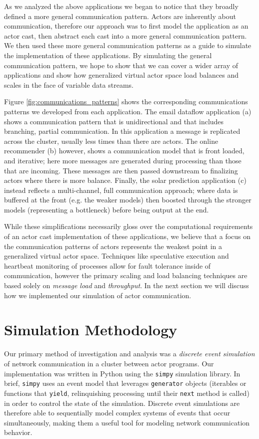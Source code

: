 \documentclass[draftclsnofoot,onecolumn,conference,11pt]{IEEEtran}
\begin{document}
As we analyzed the above applications we began to notice that they broadly defined a more general communication pattern. Actors are inherently about communication, therefore our approach was to first model the application as an actor cast, then abstract each cast into a more general communication pattern. We then used these more general communication patterns as a guide to simulate the implementation of these applications. By simulating the general communication pattern, we hope to show that we can cover a wider array of applications and show how generalized virtual actor space load balances and scales in the face of variable data streams.

Figure \ref{fig:communications_patterns} shows the corresponding communications patterns we developed from each application. The email dataflow application (a) shows a communication pattern that is unidirectional and that includes branching, partial communication. In this application a message is replicated across the cluster, usually less times than there are actors. The online recommender (b) however, shows a communication model that is front loaded, and iterative; here more messages are generated during processing than those that are incoming. These messages are then passed downstream to finalizing actors where there is more balance. Finally, the solar prediction application (c) instead reflects a multi-channel, full communication approach; where data is buffered at the front (e.g. the weaker models) then boosted through the stronger models (representing a bottleneck) before being output at the end.

While these simplifications necessarily gloss over the computational requirements of an actor cast implementation of these applications, we believe that a focus on the communication patterns of actors represents the weakest point in a generalized virtual actor space. Techniques like speculative execution and heartbeat monitoring of processes allow for fault tolerance inside of communication, however the primary scaling and load balancing techniques are based solely on \textit{message load} and \textit{throughput}. In the next section we will discuss how we implemented our simulation of actor communication.

\section{Simulation Methodology}

Our primary method of investigation and analysis was a \textit{discrete event simulation} of network communication in a cluster between actor programs. Our implementation was written in Python using the \texttt{simpy} \cite{matloff_introduction_2008} simulation library. In brief, \texttt{simpy} uses an event model that leverages \texttt{generator} objects (iterables or functions that \texttt{yield}, relinquishing processing until their \texttt{next} method is called) in order to control the state of the simulation. Discrete event simulations are therefore able to sequentially model complex systems of events that occur simultaneously, making them a useful tool for modeling network communication behavior.
\end{document}
